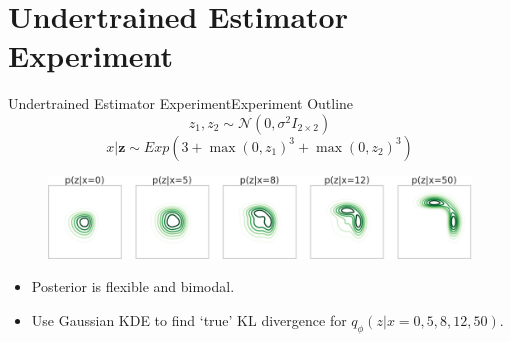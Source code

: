 \documentclass[handout]{beamer}
\begin{document}
\section{Undertrained Estimator Experiment}
\begin{frame}{Undertrained Estimator Experiment}{Experiment Outline}
\[z_1,z_2\sim \mathcal{N} (0,\sigma^2 I_{2\times 2})\]
\[x|\bm{z}\sim Exp(3+\max(0,z_1)^3+\max(0,z_2)^3)\]
\begin{figure}[h]
\includegraphics[width=\textwidth]{sprinklertrue.png}
\end{figure}
\begin{itemize}
\item Posterior is flexible and bimodal.
\item Use Gaussian KDE to find `true' KL divergence for $q_\phi(z|x=0,5,8,12,50)$.
\end{itemize}
\end{frame}
\end{document}
